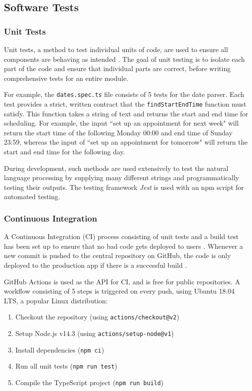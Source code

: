 \documentclass{article}
\begin{document}
\subsection{Software Tests}

\subsubsection{Unit Tests}

Unit tests, a method to test individual units of code, are used to ensure all components are behaving as intended \cite{tosun_effectiveness_2018}. The goal of unit testing is to isolate each part of the code and ensure that individual parts are correct, before writing comprehensive tests for an entire module.

For example, the \texttt{dates.spec.ts} file consists of 5 tests for the date parser. Each test provides a strict, written contract that the \texttt{findStartEndTime} function must satisfy. This function takes a string of text and returns the start and end time for scheduling. For example, the input ``set up an appointment for next week" will return the start time of the following Monday 00:00 and end time of Sunday 23:59, whereas the input of ``set up an appointment for tomorrow" will return the start and end time for the following day.

During development, such methods are used extensively to test the natural language processing by supplying many different strings and programmatically testing their outputs. The testing framework \emph{Jest} is used with an npm script for automated testing.

\subsubsection{Continuous Integration}

A Continuous Integration (CI) process consisting of unit tests and a build test has been set up to ensure that no bad code gets deployed to users \cite{li_extensive_2020}. Whenever a new commit is pushed to the central repository on GitHub, the code is only deployed to the production app if there is a successful build \cite{noauthor_what_2019}.

GitHub Actions is used as the API for CI, and is free for public repositories. A workflow consisting of 5 steps is triggered on every push, using Ubuntu  18.04 LTS, a popular Linux distribution:

\begin{enumerate}
	\item Checkout the repository (using \texttt{actions/checkout@v2})
	\item Setup Node.js v14.3 (using \texttt{actions/setup-node@v1})
	\item Install dependencies (\texttt{npm ci})
	\item Run all unit tests (\texttt{npm run test})
	\item Compile the TypeScript project (\texttt{npm run build})
\end{enumerate}
\end{document}
